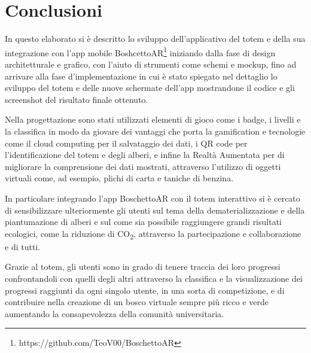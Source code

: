 \chapter{Conclusioni}
In questo elaborato si è descritto lo sviluppo dell'applicativo del totem e della sua integrazione con l'app mobile BoshcettoAR\footnote{https://github.com/TeoV00/BoschettoAR} iniziando dalla fase di design architetturale e grafico, con l'aiuto di strumenti come schemi e mockup, fino ad arrivare alla fase d'implementazione in cui è stato spiegato nel dettaglio lo sviluppo del totem e delle nuove schermate dell'app mostrandone il codice e gli screenshot del risultato finale ottenuto.

Nella progettazione sono stati utilizzati elementi di gioco come i badge, i livelli e la classifica in modo da giovare dei vantaggi che porta la gamification e tecnologie come il cloud computing per il salvataggio dei dati, i QR code per l'identificazione del totem e degli alberi, e infine la Realtà Aumentata per di migliorare la comprensione dei dati mostrati, attraverso l'utilizzo di oggetti virtuali come, ad esempio, plichi di carta e taniche di benzina.

In particolare integrando l'app BoschettoAR con il totem interattivo si è cercato di sensibilizzare ulteriormente gli utenti sul tema della dematerializzazione e della piantumazione di alberi e sul come sia possibile raggiungere grandi risultati ecologici, come la riduzione di CO\textsubscript{2}, attraverso la partecipazione e collaborazione e di tutti.

Grazie al totem, gli utenti sono in grado di tenere traccia dei loro progressi confrontandoli con quelli degli altri attraverso la classifica e la visualizzazione dei progressi raggiunti da ogni singolo utente, in una sorta di competizione, e di contribuire nella creazione di un bosco virtuale sempre più ricco e verde aumentando la consapevolezza della comunità universitaria.


